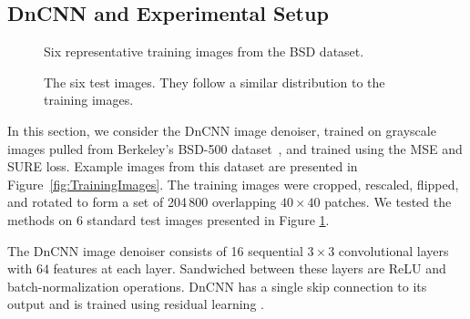 \documentclass{article}
\begin{document}
\subsection{DnCNN and Experimental Setup\label{sec:expsetupDnCNN}}\begin{figure}[t]
\centering
{}
\caption{Six representative training images from the BSD dataset.}\label{fig:TrainingImages}

\caption{The six test images. They follow a similar distribution to the training images.} \label{fig:NaturalTestImages}


\end{figure}In this section, we consider the DnCNN image denoiser, trained on grayscale images pulled from Berkeley's BSD-500 dataset~\cite{BSDDataset}, and trained using the MSE and SURE loss. Example images from this dataset are presented in Figure~\ref{fig:TrainingImages}. 
The training images were cropped, rescaled, flipped, and rotated to form a set of 204\,800 overlapping $40\times 40$ patches. %
We tested the methods on 6 standard test images presented in Figure \ref{fig:NaturalTestImages}. %

The DnCNN image denoiser \cite{DnCNN} consists of 16 sequential $3\times 3$ convolutional layers with $64$ features at each layer. Sandwiched between these layers are ReLU and batch-normalization operations. DnCNN has a single skip connection to its output and is trained using residual learning \cite{residuallearning}.
\end{document}
